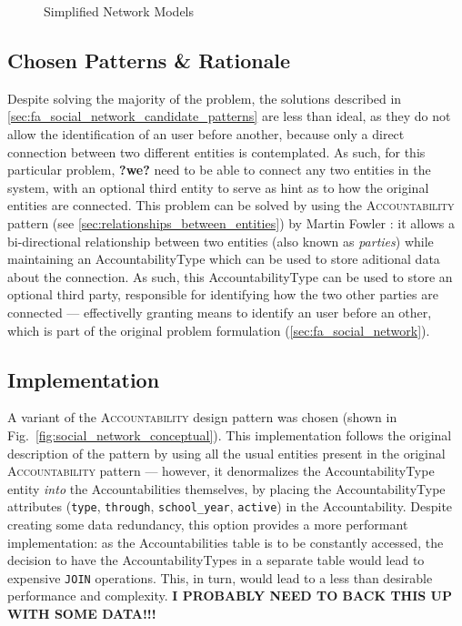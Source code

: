 \begin{figure}[H]
  \centering
  \hspace{20mm}
  \caption{Simplified Network Models}
  \label{fig:simplified_network_models}
\end{figure}

\subsection{Chosen Patterns \& Rationale}\label{sec:fa_social_network_chosen_patterns_rationale}

Despite solving the majority of the problem, the solutions described in \ref{sec:fa_social_network_candidate_patterns} are less than ideal, as they do not allow the identification of an user before another, because only a direct connection between two different entities is contemplated. As such, for this particular problem, \textbf{?we?} need to be able to connect any two entities in the system, with an optional third entity to serve as hint as to how the original entities are connected. This problem can be solved by using the \textsc{Accountability} pattern (see \ref{sec:relationships_between_entities}) by Martin Fowler \cite{fowler_accountability}: it allows a bi-directional relationship between two entities (also known as \emph{parties}) while maintaining an AccountabilityType which can be used to store aditional data about the connection. As such, this AccountabilityType can be used to store an optional third party, responsible for identifying how the two other parties are connected --- effectivelly granting means to identify an user before an other, which is part of the original problem formulation (\ref{sec:fa_social_network}).

\subsection{Implementation}\label{sec:fa_social_network_implementation}

A variant of the \textsc{Accountability} design pattern was chosen (shown in Fig.~\ref{fig:social_network_conceptual}). This implementation follows the original description of the pattern by using all the usual entities present in the original \textsc{Accountability} pattern \cite{fowler_accountability} --- however, it denormalizes the AccountabilityType entity \emph{into} the Accountabilities themselves, by placing the AccountabilityType attributes (\verb!type!, \verb!through!, \verb!school_year!, \verb!active!) in the Accountability. Despite creating some data redundancy, this option provides a more performant implementation: as the Accountabilities table is to be constantly accessed, the decision to have the AccountabilityTypes in a separate table would lead to expensive \verb!JOIN! operations. This, in turn, would lead to a less than desirable performance and complexity. \textbf{I PROBABLY NEED TO BACK THIS UP WITH SOME DATA!!!}

